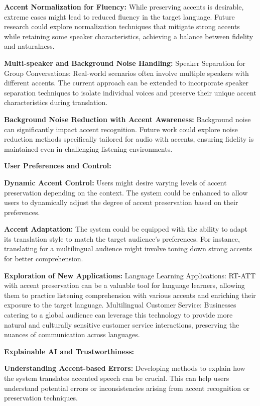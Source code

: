\documentclass[12px, a4paper]{article}
\begin{document}
\textbf{Accent Normalization for Fluency:} While preserving accents is desirable, extreme cases might lead to reduced fluency in the target language. Future research could explore normalization techniques that mitigate strong accents while retaining some speaker characteristics, achieving a balance between fidelity and naturalness.

\textbf{Multi-speaker and Background Noise Handling:}
Speaker Separation for Group Conversations: Real-world scenarios often involve multiple speakers with different accents. The current approach can be extended to incorporate speaker separation techniques to isolate individual voices and preserve their unique accent characteristics during translation.

\textbf{Background Noise Reduction with Accent Awareness:} Background noise can significantly impact accent recognition. Future work could explore noise reduction methods specifically tailored for audio with accents, ensuring fidelity is maintained even in challenging listening environments.

\textbf{User Preferences and Control:}

\textbf{Dynamic Accent Control:} Users might desire varying levels of accent preservation depending on the context. The system could be enhanced to allow users to dynamically adjust the degree of accent preservation based on their preferences.

\textbf{Accent Adaptation:} The system could be equipped with the ability to adapt its translation style to match the target audience's preferences. For instance, translating for a multilingual audience might involve toning down strong accents for better comprehension.

\textbf{Exploration of New Applications:}
Language Learning Applications: RT-ATT with accent preservation can be a valuable tool for language learners, allowing them to practice listening comprehension with various accents and enriching their exposure to the target language.
Multilingual Customer Service: Businesses catering to a global audience can leverage this technology to provide more natural and culturally sensitive customer service interactions, preserving the nuances of communication across languages.

\textbf{Explainable AI and Trustworthiness:}

\textbf{Understanding Accent-based Errors:} Developing methods to explain how the system translates accented speech can be crucial. This can help users understand potential errors or inconsistencies arising from accent recognition or preservation techniques.
\end{document}

